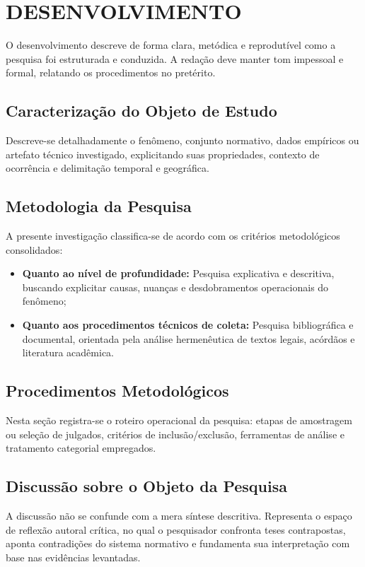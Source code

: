 \documentclass[
    12pt,               %
    openright,          %
    oneside,            %
    a4paper,            %
    english,            %
    brazil              %
]{abntex2}
\begin{document}
\chapter{DESENVOLVIMENTO}
\label{cap:desenvolvimento}

O desenvolvimento descreve de forma clara, metódica e reprodutível como a pesquisa foi estruturada e conduzida. A redação deve manter tom impessoal e formal, relatando os procedimentos no pretérito.

\section{Caracterização do Objeto de Estudo}
\label{sec:objeto}
Descreve-se detalhadamente o fenômeno, conjunto normativo, dados empíricos ou artefato técnico investigado, explicitando suas propriedades, contexto de ocorrência e delimitação temporal e geográfica.

\section{Metodologia da Pesquisa}
\label{sec:metodologia}
A presente investigação classifica-se de acordo com os critérios metodológicos consolidados:
\begin{itemize}
    \item \textbf{Quanto ao nível de profundidade:} Pesquisa explicativa e descritiva, buscando explicitar causas, nuanças e desdobramentos operacionais do fenômeno;
    \item \textbf{Quanto aos procedimentos técnicos de coleta:} Pesquisa bibliográfica e documental, orientada pela análise hermenêutica de textos legais, acórdãos e literatura acadêmica.
\end{itemize}

\section{Procedimentos Metodológicos}
\label{sec:procedimentos}
Nesta seção registra-se o roteiro operacional da pesquisa: etapas de amostragem ou seleção de julgados, critérios de inclusão/exclusão, ferramentas de análise e tratamento categorial empregados.

\section{Discussão sobre o Objeto da Pesquisa}
\label{sec:discussao}
A discussão não se confunde com a mera síntese descritiva. Representa o espaço de reflexão autoral crítica, no qual o pesquisador confronta teses contrapostas, aponta contradições do sistema normativo e fundamenta sua interpretação com base nas evidências levantadas.
\end{document}
